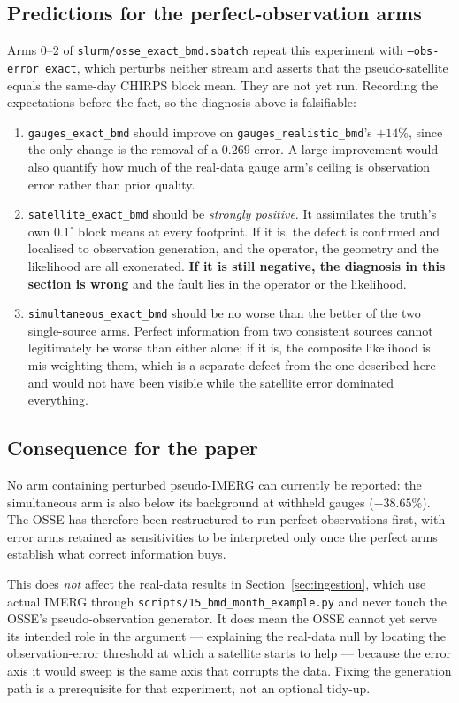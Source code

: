 \subsection{Predictions for the perfect-observation arms}
\label{sec:osse-error-predictions}

Arms 0--2 of \texttt{slurm/osse\_exact\_bmd.sbatch} repeat this experiment with
\texttt{--obs-error exact}, which perturbs neither stream and asserts that the
pseudo-satellite equals the same-day CHIRPS block mean. They are not yet run.
Recording the expectations before the fact, so the diagnosis above is
falsifiable:

\begin{enumerate}
  \item \texttt{gauges\_exact\_bmd} should improve on
    \texttt{gauges\_realistic\_bmd}'s $+14\%$, since the only change is the
    removal of a $0.269$ error. A large improvement would also quantify how
    much of the real-data gauge arm's ceiling is observation error rather than
    prior quality.
  \item \texttt{satellite\_exact\_bmd} should be \emph{strongly positive}. It
    assimilates the truth's own $0.1^\circ$ block means at every footprint. If
    it is, the defect is confirmed and localised to observation generation, and
    the operator, the geometry and the likelihood are all exonerated. \textbf{If
    it is still negative, the diagnosis in this section is wrong} and the fault
    lies in the operator or the likelihood.
  \item \texttt{simultaneous\_exact\_bmd} should be no worse than the better of
    the two single-source arms. Perfect information from two consistent sources
    cannot legitimately be worse than either alone; if it is, the composite
    likelihood is mis-weighting them, which is a separate defect from the one
    described here and would not have been visible while the satellite error
    dominated everything.
\end{enumerate}

\subsection{Consequence for the paper}

No arm containing perturbed pseudo-IMERG can currently be reported: the
simultaneous arm is also below its background at withheld gauges
($-38.65\%$). The OSSE has therefore been restructured to run perfect
observations first, with error arms retained as sensitivities to be interpreted
only once the perfect arms establish what correct information buys.

This does \emph{not} affect the real-data results in
Section~\ref{sec:ingestion}, which use actual IMERG through
\texttt{scripts/15\_bmd\_month\_example.py} and never touch the OSSE's
pseudo-observation generator. It does mean the OSSE cannot yet serve its
intended role in the argument --- explaining the real-data null by locating the
observation-error threshold at which a satellite starts to help --- because the
error axis it would sweep is the same axis that corrupts the data. Fixing the
generation path is a prerequisite for that experiment, not an optional tidy-up.
